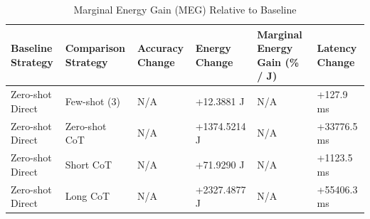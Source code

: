 \begin{table}
\caption{Marginal Energy Gain (MEG) Relative to Baseline}
\label{tab:marginal_energy_gain}
\begin{tabular}{llllll}
\toprule
Baseline Strategy & Comparison Strategy & Accuracy Change & Energy Change & Marginal Energy Gain (\% / J) & Latency Change \\
\midrule
Zero-shot Direct & Few-shot (3) & N/A & +12.3881 J & N/A & +127.9 ms \\
Zero-shot Direct & Zero-shot CoT & N/A & +1374.5214 J & N/A & +33776.5 ms \\
Zero-shot Direct & Short CoT & N/A & +71.9290 J & N/A & +1123.5 ms \\
Zero-shot Direct & Long CoT & N/A & +2327.4877 J & N/A & +55406.3 ms \\
\bottomrule
\end{tabular}
\end{table}
